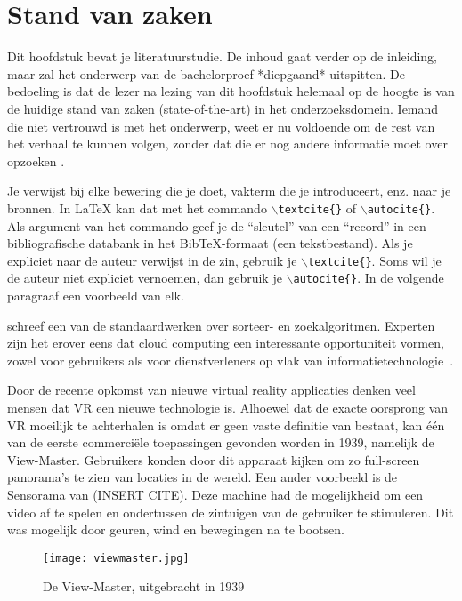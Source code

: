 \chapter{Stand van zaken}
\label{ch:stand-van-zaken}



Dit hoofdstuk bevat je literatuurstudie. De inhoud gaat verder op de inleiding, maar zal het onderwerp van de bachelorproef *diepgaand* uitspitten. De bedoeling is dat de lezer na lezing van dit hoofdstuk helemaal op de hoogte is van de huidige stand van zaken (state-of-the-art) in het onderzoeksdomein. Iemand die niet vertrouwd is met het onderwerp, weet er nu voldoende om de rest van het verhaal te kunnen volgen, zonder dat die er nog andere informatie moet over opzoeken \autocite{Pollefliet2011}.

Je verwijst bij elke bewering die je doet, vakterm die je introduceert, enz. naar je bronnen. In \LaTeX{} kan dat met het commando \texttt{$\backslash${textcite\{\}}} of \texttt{$\backslash${autocite\{\}}}. Als argument van het commando geef je de ``sleutel'' van een ``record'' in een bibliografische databank in het Bib\TeX{}-formaat (een tekstbestand). Als je expliciet naar de auteur verwijst in de zin, gebruik je \texttt{$\backslash${}textcite\{\}}.
Soms wil je de auteur niet expliciet vernoemen, dan gebruik je \texttt{$\backslash${}autocite\{\}}. In de volgende paragraaf een voorbeeld van elk.

\textcite{Knuth1998} schreef een van de standaardwerken over sorteer- en zoekalgoritmen. Experten zijn het erover eens dat cloud computing een interessante opportuniteit vormen, zowel voor gebruikers als voor dienstverleners op vlak van informatietechnologie~\autocite{Creeger2009}.

Door de recente opkomst van nieuwe virtual reality applicaties denken veel mensen dat VR een nieuwe technologie is. Alhoewel dat de exacte oorsprong van VR moeilijk te achterhalen is omdat er geen vaste definitie van bestaat, kan één van de eerste commerciële toepassingen gevonden worden in 1939, namelijk de View-Master. Gebruikers konden door dit apparaat kijken om zo full-screen panorama's te zien van locaties in de wereld. Een ander voorbeeld is de Sensorama van (INSERT CITE). Deze machine had de mogelijkheid om een video af te spelen en ondertussen de zintuigen van de gebruiker te stimuleren. Dit was mogelijk door geuren, wind en bewegingen na te bootsen.
\begin{figure}
    \texttt{[image: viewmaster.jpg]}
    \caption{De View-Master, uitgebracht in 1939}
    \label{fig:viewmaster}
\end{figure}

